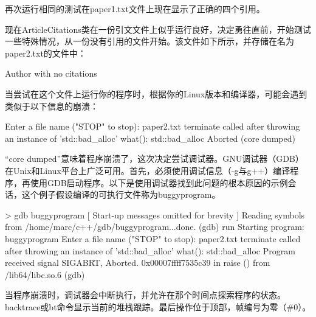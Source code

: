 再次运行相同的测试在paper1.txt文件上现在显示了正确的四个引用。


现在ArticleCitations类在一份引文文件上似乎运行良好，决定勇往直前，开始测试一些特殊情况，从一份没有引用的文件开始。该文件如下所示，并存储在名为paper2.txt的文件中：

\begin{shell}
Author with no citations
\end{shell}

当尝试在这个文件上运行你的程序时，根据你的Linux版本和编译器，可能会遇到类似于以下信息的崩溃：

\begin{shell}
Enter a file name ("STOP" to stop): paper2.txt
terminate called after throwing an instance of 'std::bad_alloc'
    what(): std::bad_alloc
Aborted (core dumped)
\end{shell}

“core dumped”意味着程序崩溃了，这次决定尝试调试器。GNU调试器（GDB）在Unix和Linux平台上广泛可用。首先，必须使用调试信息（-g与g++）编译程序，再使用GDB启动程序。以下是使用调试器找到此问题的根本原因的示例会话，这个例子假设编译的可执行文件称为buggyprogram。

\begin{shell}
> gdb buggyprogram
[ Start-up messages omitted for brevity ]
Reading symbols from /home/marc/c++/gdb/buggyprogram...done.
(gdb) run
Starting program: buggyprogram
Enter a file name ("STOP" to stop): paper2.txt
terminate called after throwing an instance of 'std::bad_alloc'
    what(): std::bad_alloc
Program received signal SIGABRT, Aborted.
0x00007ffff7535c39 in raise () from /lib64/libc.so.6
(gdb)
\end{shell}

当程序崩溃时，调试器会中断执行，并允许在那个时间点探索程序的状态。backtrace或bt命令显示当前的堆栈跟踪。最后操作位于顶部，帧编号为零（\#0）。


